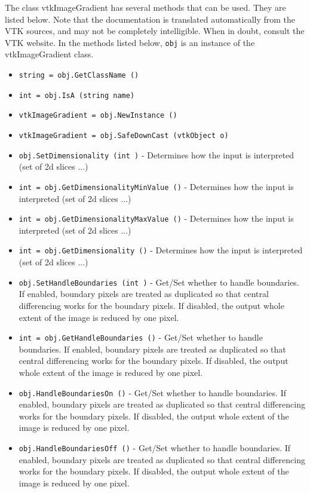 The class vtkImageGradient has several methods that can be used.
  They are listed below.
Note that the documentation is translated automatically from the VTK sources,
and may not be completely intelligible.  When in doubt, consult the VTK website.
In the methods listed below, \verb|obj| is an instance of the vtkImageGradient class.
\begin{itemize}
\item  \verb|string = obj.GetClassName ()|

\item  \verb|int = obj.IsA (string name)|

\item  \verb|vtkImageGradient = obj.NewInstance ()|

\item  \verb|vtkImageGradient = obj.SafeDownCast (vtkObject o)|

\item  \verb|obj.SetDimensionality (int )| -  Determines how the input is interpreted (set of 2d slices ...)

\item  \verb|int = obj.GetDimensionalityMinValue ()| -  Determines how the input is interpreted (set of 2d slices ...)

\item  \verb|int = obj.GetDimensionalityMaxValue ()| -  Determines how the input is interpreted (set of 2d slices ...)

\item  \verb|int = obj.GetDimensionality ()| -  Determines how the input is interpreted (set of 2d slices ...)

\item  \verb|obj.SetHandleBoundaries (int )| -  Get/Set whether to handle boundaries.  If enabled, boundary
 pixels are treated as duplicated so that central differencing
 works for the boundary pixels.  If disabled, the output whole
 extent of the image is reduced by one pixel.

\item  \verb|int = obj.GetHandleBoundaries ()| -  Get/Set whether to handle boundaries.  If enabled, boundary
 pixels are treated as duplicated so that central differencing
 works for the boundary pixels.  If disabled, the output whole
 extent of the image is reduced by one pixel.

\item  \verb|obj.HandleBoundariesOn ()| -  Get/Set whether to handle boundaries.  If enabled, boundary
 pixels are treated as duplicated so that central differencing
 works for the boundary pixels.  If disabled, the output whole
 extent of the image is reduced by one pixel.

\item  \verb|obj.HandleBoundariesOff ()| -  Get/Set whether to handle boundaries.  If enabled, boundary
 pixels are treated as duplicated so that central differencing
 works for the boundary pixels.  If disabled, the output whole
 extent of the image is reduced by one pixel.

\end{itemize}
